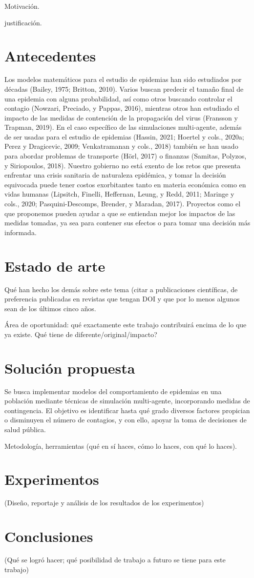 \documentclass{sciposter}
\begin{document}
Motivación.

justificación. 

\section{Antecedentes}
Los modelos matemáticos para el estudio de epidemias han sido estudiados por décadas (Bailey, 1975; Britton, 2010). Varios buscan predecir el tamaño final de una epidemia con alguna probabilidad, así como otros buscando controlar el contagio (Nowzari, Preciado, y Pappas, 2016), mientras otros han estudiado el impacto de las medidas de contención de la
propagación del virus (Fransson y Trapman, 2019). En el caso específico de las simulaciones multi-agente, además de ser usadas para el estudio de epidemias (Hassin, 2021; Hoertel y
cols., 2020a; Perez y Dragicevic, 2009; Venkatramanan y cols., 2018) también se han usado para abordar problemas de transporte (Hörl, 2017) o finanzas (Samitas, Polyzos, y Siriopoulos, 2018). Nuestro gobierno no está exento de los retos que presenta enfrentar una crisis sanitaria de naturaleza epidémica, y tomar la decisión equivocada puede tener costos exorbitantes tanto en materia económica como en vidas humanas (Lipsitch, Finelli, Heffernan, Leung, y Redd, 2011; Maringe y cols., 2020; Pasquini-Descomps, Brender, y Maradan, 2017). Proyectos como el que proponemos pueden ayudar a que se entiendan mejor los impactos de las medidas tomadas, ya sea para contener sus efectos o para tomar una decisión más informada.


\section{Estado de arte}

Qué han hecho los demás sobre este tema (citar a publicaciones científicas, de preferencia publicadas en revistas que tengan DOI y que por lo menos algunos sean de los últimos cinco años.

Área de oportunidad: qué exactamente este trabajo contribuirá encima de lo que ya existe.  {\textquestiondown}Qué tiene de diferente/original/impacto?

\section{Solución propuesta}
Se busca implementar modelos del comportamiento de epidemias en una población mediante técnicas de simulación multi-agente, incorporando medidas de contingencia. El objetivo es identificar hasta qué grado diversos factores propician o disminuyen el número de contagios, y con ello, apoyar la toma de decisiones de salud pública.

Metodología, herramientas (qué en sí haces, cómo lo haces, con qué lo haces).

\section{Experimentos}

(Diseño, reportaje y análisis de los resultados de los experimentos)

\section{Conclusiones}

(Qué se logró hacer; qué posibilidad de trabajo a futuro se tiene para este trabajo)
\end{document}
